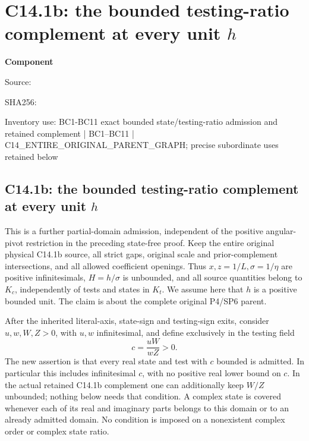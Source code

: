 \chapter{C14.1b: the bounded testing-ratio complement at every unit $h$}
\label{component:p5cd5fa89abcc}
\noindent\textbf{Component }\par
{\small\noindent Source: \par}
{\small\noindent SHA256: \par}
{\small\noindent Inventory use: BC1-BC11 exact bounded state/testing-ratio admission and retained complement | BC1--BC11 | C14\_\allowbreak{}ENTIRE\_\allowbreak{}ORIGINAL\_\allowbreak{}PARENT\_\allowbreak{}GRAPH; precise subordinate uses retained below\par}
\medskip
\section{C14.1b: the bounded testing-ratio complement at every unit $h$}
\label{p5cd5fa89abcc:sec:c141b-bounded-testing-ratio}

This is a further partial-domain admission, independent of the positive
angular-pivot restriction in the preceding state-free proof. Keep the
entire original physical C14.1b source, all strict gaps, original scale
and prior-complement intersections, and all allowed coefficient openings.
Thus $x,z=1/L,\sigma=1/\eta$ are positive infinitesimals, $H=h/\sigma$
is unbounded, and all source quantities belong to $K_c$, independently
of tests and states in $K_t$. We assume here that $h$ is a positive
bounded unit. The claim is about the complete original P4/SP6 parent.

After the inherited literal-axis, state-sign and testing-sign exits,
consider $u,w,W,Z>0$, with $u,w$ infinitesimal, and define exclusively
in the testing field
\[
                 c=\frac{uW}{wZ}>0.
                 \tag{BC1}
\]
The new assertion is that every real state and test with $c$ bounded
is admitted. In particular this includes infinitesimal $c$, with no
positive real lower bound on $c$. In the actual retained C14.1b
complement one can additionally keep $W/Z$ unbounded; nothing below
needs that condition. A complex state is covered whenever each of its
real and imaginary parts belongs to this domain or to an already
admitted domain. No condition is imposed on a nonexistent complex
order or complex state ratio.

